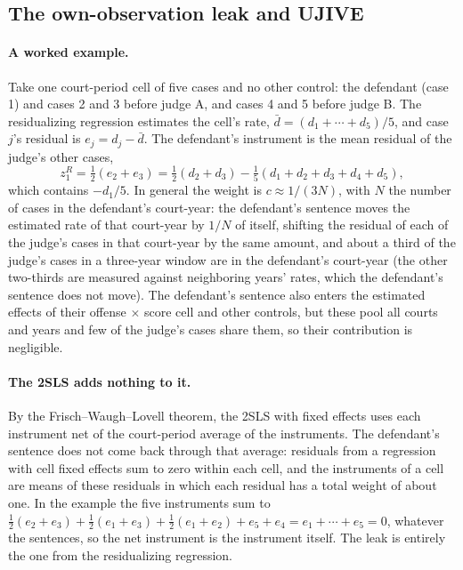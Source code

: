 \documentclass[11pt]{article}
\begin{document}
\subsection{The own-observation leak and UJIVE}\label{sec:leak_details}

\paragraph{A worked example.} Take one court-period cell of five cases and no other control: the defendant (case 1) and cases 2 and 3 before judge A, and cases 4 and 5 before judge B. The residualizing regression estimates the cell's rate, $\bar d = (d_1 + \cdots + d_5)/5$, and case $j$'s residual is $e_j = d_j - \bar d$. The defendant's instrument is the mean residual of the judge's other cases,
\begin{equation*}
z^R_1 = \tfrac12(e_2 + e_3) = \tfrac12(d_2 + d_3) - \tfrac15(d_1 + d_2 + d_3 + d_4 + d_5),
\end{equation*}
which contains $-d_1/5$. In general the weight is $c \approx 1/(3N)$, with $N$ the number of cases in the defendant's court-year: the defendant's sentence moves the estimated rate of that court-year by $1/N$ of itself, shifting the residual of each of the judge's cases in that court-year by the same amount, and about a third of the judge's cases in a three-year window are in the defendant's court-year (the other two-thirds are measured against neighboring years' rates, which the defendant's sentence does not move). The defendant's sentence also enters the estimated effects of their offense $\times$ score cell and other controls, but these pool all courts and years and few of the judge's cases share them, so their contribution is negligible.

\paragraph{The 2SLS adds nothing to it.} By the Frisch--Waugh--Lovell theorem, the 2SLS with fixed effects uses each instrument net of the court-period average of the instruments. The defendant's sentence does not come back through that average: residuals from a regression with cell fixed effects sum to zero within each cell, and the instruments of a cell are means of these residuals in which each residual has a total weight of about one. In the example the five instruments sum to $\tfrac12(e_2 + e_3) + \tfrac12(e_1 + e_3) + \tfrac12(e_1 + e_2) + e_5 + e_4 = e_1 + \cdots + e_5 = 0$, whatever the sentences, so the net instrument is the instrument itself. The leak is entirely the one from the residualizing regression.
\end{document}
